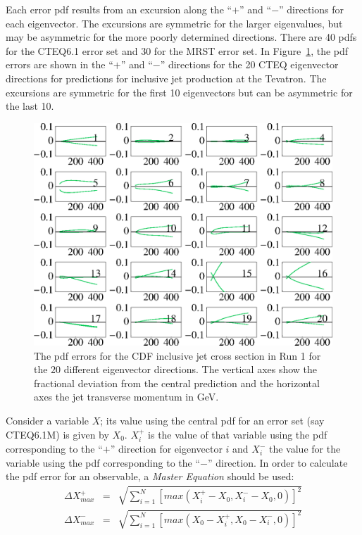 \documentclass[12pt]{iopart}
\begin{document}
Each error pdf results from an excursion along the ``$+$'' and ``$-$'' directions for each eigenvector. The excursions are symmetric
for the larger eigenvalues, but may be asymmetric for the more poorly determined directions. There are 40 pdfs for the CTEQ6.1
error set and 30 for the MRST error set.  In Figure~\ref{fig:jet_errors}, the pdf errors are shown in the ``$+$'' and ``$-$''
directions for the 20 CTEQ eigenvector directions for predictions for inclusive jet production at the Tevatron. The excursions
are symmetric for the first 10 eigenvectors but can be asymmetric for the last 10. 
%
\begin{figure}[t]
\begin{center}
\includegraphics[width=12cm]{CDFjetC.eps}
\end{center}
\caption{
The pdf errors for the CDF inclusive jet cross section in Run 1 for the $20$ different eigenvector directions.
The vertical axes show the fractional deviation from the central prediction and the horizontal axes the jet
transverse momentum in GeV. 
\label{fig:jet_errors}
}
\end{figure}
%


Consider a variable $X$; its value using the central pdf for an error set (say CTEQ6.1M) is given by $X_0$. $X_i^+$
is the value of that variable using the pdf corresponding to the ``$+$'' direction for eigenvector $i$ and $X_i^-$ the
value for the variable using the pdf corresponding to the ``$-$'' direction. 
In order to calculate the pdf error for an observable, a {\it Master Equation} should be used: 
\begin{eqnarray}  
\Delta X^{+}_{max}&=&\sqrt{\sum_{i=1}^N[max(X^{+}_{i}-X_{0},X^{-}_{i}-X_{0},0)]^{2}} \nonumber \\
\Delta X^{-}_{max}&=&\sqrt{\sum_{i=1}^N[max(X_{0}-X^{+}_{i},X_{0}-X^{-}_{i},0)]^{2}}
\end{eqnarray}  
\end{document}
